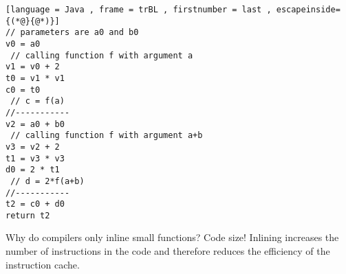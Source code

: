 \begin{lstlisting}[language = Java , frame = trBL , firstnumber = last , escapeinside={(*@}{@*)}]
// parameters are a0 and b0
v0 = a0
 // calling function f with argument a
v1 = v0 + 2
t0 = v1 * v1
c0 = t0
 // c = f(a)
//-----------
v2 = a0 + b0
 // calling function f with argument a+b
v3 = v2 + 2
t1 = v3 * v3
d0 = 2 * t1
 // d = 2*f(a+b)
//-----------
t2 = c0 + d0
return t2
\end{lstlisting}

Why do compilers only inline small functions? Code size! Inlining increases the number of
instructions in the code and therefore reduces the efficiency of the instruction cache.